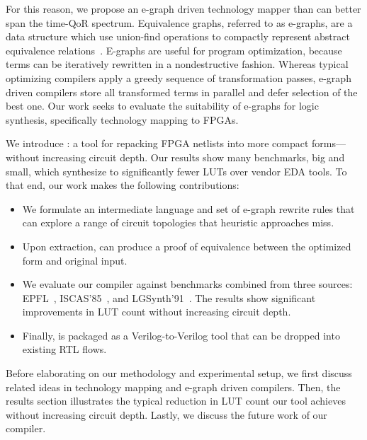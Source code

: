 For this reason, we propose an e-graph driven technology mapper than can better
span the time-QoR spectrum. Equivalence graphs, referred to as e-graphs, are a
data structure which use union-find operations to compactly represent abstract
equivalence relations~\cite{eggpaper}. E-graphs are useful for program
optimization, because terms can be iteratively rewritten in a nondestructive
fashion. Whereas typical optimizing compilers apply a greedy sequence of
transformation passes, e-graph driven compilers store all transformed terms in
parallel and defer selection of the best one. Our work seeks to evaluate the
suitability of e-graphs for logic synthesis, specifically technology mapping to
FPGAs.

We introduce \shortname{}: a tool for repacking FPGA netlists into more compact
forms---without increasing circuit depth. Our results show many benchmarks, big
and small, which synthesize to significantly fewer LUTs over vendor EDA tools.
To that end, our work makes the following contributions:

\begin{itemize}
    \item We formulate an intermediate language and set of e-graph rewrite rules that can
          explore a range of circuit topologies that heuristic approaches miss.
    \item Upon extraction, \shortname{} can produce a proof of equivalence between the
          optimized form and original input.
    \item We evaluate our compiler against \nbenchmarks{} benchmarks combined from three
          sources: EPFL~\cite{epflbench}, ISCAS'85~\cite{iscasbench}, and
          LGSynth'91~\cite{lgsynthbench}. The results show significant improvements in
          LUT count without increasing circuit depth.
    \item Finally, \shortname{} is packaged as a Verilog-to-Verilog tool that can be
          dropped into existing RTL flows.
\end{itemize}

Before elaborating on our methodology and experimental setup, we first discuss
related ideas in technology mapping and e-graph driven compilers. Then, the
results section illustrates the typical reduction in LUT count our tool
achieves without increasing circuit depth. Lastly, we discuss the future work
of our compiler.